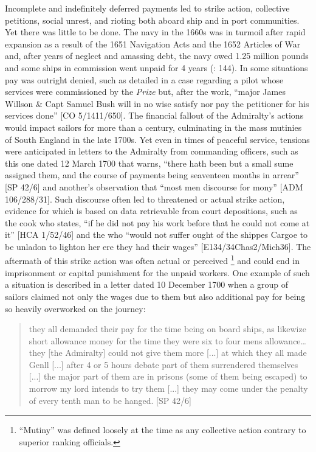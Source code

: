 Incomplete and indefinitely deferred payments led to strike action, collective petitions, social unrest, and rioting both aboard ship and in port communities. Yet there was little to be done. The navy in the 1660s was in turmoil after rapid expansion as a result of the 1651 Navigation Acts and the 1652 Articles of War and, after years of neglect and amassing debt, the navy owed 1.25 million pounds and some ships in commission went unpaid for 4 years (\citealt{Lincoln2015}: 144). In some situations pay was outright denied, such as detailed in a case regarding a pilot whose services were commissioned by the \textit{ Prize} but, after the work, “major James Willson \& Capt Samuel Bush will in no wise satisfy nor pay the petitioner for his services done” [CO 5/1411/650]. The financial fallout of the Admiralty’s actions would impact sailors for more than a century, culminating in the mass mutinies of South England in the late 1700s. Yet even in times of peaceful service, tensions were anticipated in letters to the Admiralty from commanding officers, such as this one dated 12 March {1700} that warns, “there hath been but a small sume assigned them, and the course of payments being seaventeen months in arrear” [SP 42/6] and another’s observation that “most men discourse for mony” [ADM 106/288/31]. Such discourse often led to threatened or actual strike action, evidence for which is based on data retrievable from court depositions, such as the cook who states, “if he did not pay his work before that he could not come at it” [HCA 1/52/46] and the  who “would not suffer ought of the shippes Cargoe to be unladon to lighton her ere they had their wages” [E134/34Chas2/Mich36]. The aftermath of this strike action was often actual or perceived \footnote{“Mutiny” was defined loosely at the time as any collective action contrary to superior ranking officials.} and could end in imprisonment or capital punishment for the unpaid workers. One example of such a situation is described in a letter dated 10 December {1700} when a group of sailors claimed not only the wages due to them but also additional pay for being so heavily overworked on the journey:

\begin{quotation}
they all demanded their pay for the time being on board ships, as likewize short allowance money for the time they were six to four mens allowance… they [the Admiralty] could not give them more [...] at which they all made Genll  [...] after 4 or 5 hours debate part of them surrendered themselves [...] the major part of them are in prisons (some of them being escaped) to morrow my lord intends to try them [...] they may come under the penalty of every tenth man to be hanged. [SP 42/6]\end{quotation}


